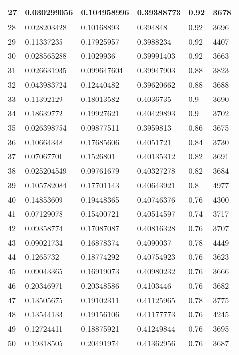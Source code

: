 \begin{longtable}{|l|l|l|l|l|l|}
27 & 0.030299056 & 0.104958996 & 0.39388773 & 0.92 & 3678 \\ \hline 
28 & 0.028203428 & 0.10168893 & 0.394848 & 0.92 & 3696 \\ \hline 
29 & 0.11337235 & 0.17925957 & 0.3988234 & 0.92 & 4407 \\ \hline 
30 & 0.028565288 & 0.1029936 & 0.39991403 & 0.92 & 3663 \\ \hline 
31 & 0.026631935 & 0.099647604 & 0.39947903 & 0.88 & 3823 \\ \hline 
32 & 0.043983724 & 0.12440482 & 0.39620662 & 0.88 & 3688 \\ \hline 
33 & 0.11392129 & 0.18013582 & 0.4036735 & 0.9 & 3690 \\ \hline 
34 & 0.18639772 & 0.19927621 & 0.40429893 & 0.9 & 3702 \\ \hline 
35 & 0.026398754 & 0.09877511 & 0.3959813 & 0.86 & 3675 \\ \hline 
36 & 0.10664348 & 0.17685606 & 0.4051721 & 0.84 & 3730 \\ \hline 
37 & 0.07067701 & 0.1526801 & 0.40135312 & 0.82 & 3691 \\ \hline 
38 & 0.025204549 & 0.09761679 & 0.40327278 & 0.82 & 3684 \\ \hline 
39 & 0.105782084 & 0.17701143 & 0.40643921 & 0.8 & 4977 \\ \hline 
40 & 0.14853609 & 0.19448365 & 0.40746376 & 0.76 & 4300 \\ \hline 
41 & 0.07129078 & 0.15400721 & 0.40514597 & 0.74 & 3717 \\ \hline 
42 & 0.09358774 & 0.17087087 & 0.40816328 & 0.76 & 3707 \\ \hline 
43 & 0.09021734 & 0.16878374 & 0.4090037 & 0.78 & 4449 \\ \hline 
44 & 0.1265732 & 0.18774292 & 0.40754923 & 0.76 & 3623 \\ \hline 
45 & 0.09043365 & 0.16919073 & 0.40980232 & 0.76 & 3666 \\ \hline 
46 & 0.20346971 & 0.20348586 & 0.4103446 & 0.76 & 3682 \\ \hline 
47 & 0.13505675 & 0.19102311 & 0.41125965 & 0.78 & 3775 \\ \hline 
48 & 0.13544133 & 0.19156106 & 0.41177773 & 0.76 & 4245 \\ \hline 
49 & 0.12724411 & 0.18875921 & 0.41249844 & 0.76 & 3695 \\ \hline 
50 & 0.19318505 & 0.20491974 & 0.41362956 & 0.76 & 3687 \\ \hline 
\end{longtable}